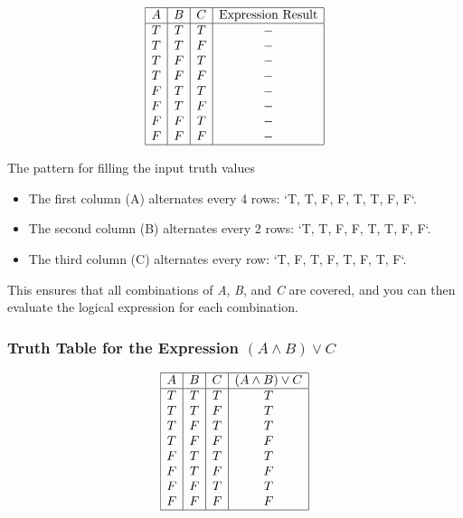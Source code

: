\[
	\begin{array}{|c|c|c|c|}
		\hline
		A & B & C & \text{Expression Result} \\
		\hline
		T & T & T &       -                  \\
		T & T & F &       -                  \\
		T & F & T &       -                  \\
		T & F & F &       -                  \\
		F & T & T &       -                  \\
		F & T & F &       -                  \\
		F & F & T &       -                  \\
		F & F & F &       -                  \\
		\hline
	\end{array}
\]

The pattern for filling the input truth values

\begin{itemize}

	\item The first column (A) alternates every 4 rows: `T, T, F, F, T, T, F, F`.

	\item The second column (B) alternates every 2 rows: `T, T, F, F, T, T, F, F`.

	\item The third column (C) alternates every row: `T, F, T, F, T, F, T, F`.

\end{itemize}

This ensures that all combinations of \emph{A}, \emph{B}, and \emph{C} are covered, and you 
can then evaluate the logical expression for each combination.

\subsubsection{Truth Table for the Expression \texorpdfstring{\( (A \land B) \lor C \)}{}}

\[
	\begin{array}{|c|c|c|c|}
		\hline
		A & B & C & (A \land B) \lor C \\
		\hline
		T & T & T & T                  \\
		T & T & F & T                  \\
		T & F & T & T                  \\
		T & F & F & F                  \\
		F & T & T & T                  \\
		F & T & F & F                  \\
		F & F & T & T                  \\
		F & F & F & F                  \\
		\hline
	\end{array}
\]

